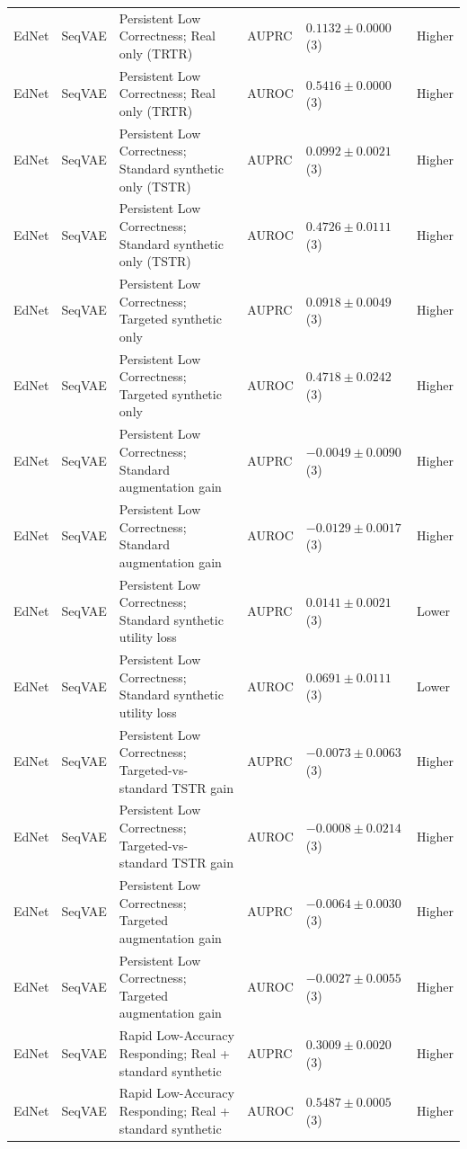 \begin{longtable}{@{}p{2.25cm}p{2.05cm}p{4.7cm}p{5.0cm}p{2.6cm}p{1.25cm}@{}}
EdNet & SeqVAE & Persistent Low Correctness; Real only (TRTR) & AUPRC & $0.1132 \mathbin{\pm} 0.0000$ (3) & Higher \\
EdNet & SeqVAE & Persistent Low Correctness; Real only (TRTR) & AUROC & $0.5416 \mathbin{\pm} 0.0000$ (3) & Higher \\
EdNet & SeqVAE & Persistent Low Correctness; Standard synthetic only (TSTR) & AUPRC & $0.0992 \mathbin{\pm} 0.0021$ (3) & Higher \\
EdNet & SeqVAE & Persistent Low Correctness; Standard synthetic only (TSTR) & AUROC & $0.4726 \mathbin{\pm} 0.0111$ (3) & Higher \\
EdNet & SeqVAE & Persistent Low Correctness; Targeted synthetic only & AUPRC & $0.0918 \mathbin{\pm} 0.0049$ (3) & Higher \\
EdNet & SeqVAE & Persistent Low Correctness; Targeted synthetic only & AUROC & $0.4718 \mathbin{\pm} 0.0242$ (3) & Higher \\
EdNet & SeqVAE & Persistent Low Correctness; Standard augmentation gain & AUPRC & $-0.0049 \mathbin{\pm} 0.0090$ (3) & Higher \\
EdNet & SeqVAE & Persistent Low Correctness; Standard augmentation gain & AUROC & $-0.0129 \mathbin{\pm} 0.0017$ (3) & Higher \\
EdNet & SeqVAE & Persistent Low Correctness; Standard synthetic utility loss & AUPRC & $0.0141 \mathbin{\pm} 0.0021$ (3) & Lower \\
EdNet & SeqVAE & Persistent Low Correctness; Standard synthetic utility loss & AUROC & $0.0691 \mathbin{\pm} 0.0111$ (3) & Lower \\
EdNet & SeqVAE & Persistent Low Correctness; Targeted-vs-standard TSTR gain & AUPRC & $-0.0073 \mathbin{\pm} 0.0063$ (3) & Higher \\
EdNet & SeqVAE & Persistent Low Correctness; Targeted-vs-standard TSTR gain & AUROC & $-0.0008 \mathbin{\pm} 0.0214$ (3) & Higher \\
EdNet & SeqVAE & Persistent Low Correctness; Targeted augmentation gain & AUPRC & $-0.0064 \mathbin{\pm} 0.0030$ (3) & Higher \\
EdNet & SeqVAE & Persistent Low Correctness; Targeted augmentation gain & AUROC & $-0.0027 \mathbin{\pm} 0.0055$ (3) & Higher \\
EdNet & SeqVAE & Rapid Low-Accuracy Responding; Real + standard synthetic & AUPRC & $0.3009 \mathbin{\pm} 0.0020$ (3) & Higher \\
EdNet & SeqVAE & Rapid Low-Accuracy Responding; Real + standard synthetic & AUROC & $0.5487 \mathbin{\pm} 0.0005$ (3) & Higher \\

\end{longtable}
